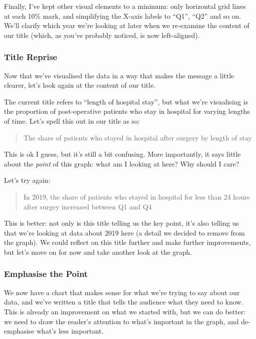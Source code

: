 \documentclass[
  letterpaper,
  DIV=11,
  numbers=noendperiod]{scrartcl}
\begin{document}
Finally, I've kept other visual elements to a minimum: only horizontal
grid lines at each 10\% mark, and simplifying the X-axis labels to
``Q1'', ``Q2'' and so on. We'll clarify which year we're looking at
later when we re-examine the content of our title (which, as you've
probably noticed, is now left-aligned).

\hypertarget{title-reprise}{%
\subsubsection{Title Reprise}\label{title-reprise}}

Now that we've visualised the data in a way that makes the message a
little clearer, let's look again at the content of our title.

The current title refers to ``length of hospital stay'', but what we're
visualising is the proportion of post-operative patients who stay in
hospital for varying lengths of time. Let's spell this out in our title
as so:

\begin{quote}
The share of patients who stayed in hospital after surgery by length of
stay
\end{quote}

This is ok I guess, but it's still a bit confusing. More importantly, it
says little about the \emph{point} of this graph: what am I looking at
here? Why should I care?

Let's try again:

\begin{quote}
In 2019, the share of patients who stayed in hospital for less than 24
hours after surgey increased between Q1 and Q4
\end{quote}

This is better: not only is this title telling us the key point, it's
also telling us that we're looking at data about 2019 here (a detail we
decided to remove from the graph). We could reflect on this title
further and make further improvements, but let's move on for now and
take another look at the graph.

\hypertarget{emphasise-the-point}{%
\subsubsection{Emphasise the Point}\label{emphasise-the-point}}

We now have a chart that makes sense for what we're trying to say about
our data, and we've written a title that tells the audience what they
need to know. This is already an improvement on what we started with,
but we can do better: we need to draw the reader's attention to what's
important in the graph, and de-emphasise what's less important.
\end{document}

